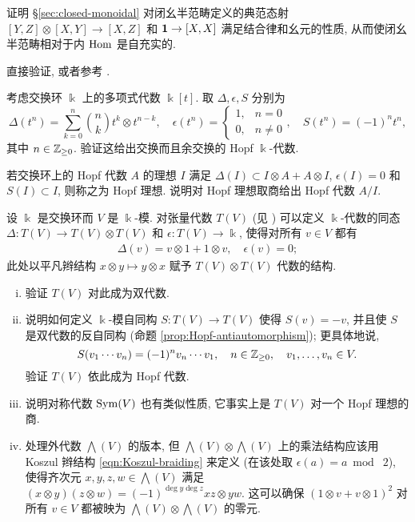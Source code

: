 \begin{Exercises}
	\item 证明 \S\ref{sec:closed-monoidal} 对闭幺半范畴定义的典范态射 $[Y, Z] \otimes [X, Y] \to [X, Z]$ 和 $\bm{1} \to [X, X]$ 满足结合律和幺元的性质, 从而使闭幺半范畴相对于内 $\operatorname{Hom}$ 是自充实的.
	\begin{hint}
		直接验证, 或者参考 \cite[Section 1.6]{Kel05}.
	\end{hint}

	\item 考虑交换环 $\Bbbk$ 上的多项式代数 $\Bbbk[t]$. 取 $\Delta, \epsilon, S$ 分别为
	\[ \Delta(t^n) = \sum_{k=0}^n \binom{n}{k} t^k \otimes t^{n-k}, \quad \epsilon(t^n) = \begin{cases}
		1, & n = 0 \\
		0, & n \neq 0
	\end{cases}, \quad
	S(t^n) = (-1)^n t^n, \]
	其中 $n \in \mathbb{Z}_{\geq 0}$. 验证这给出交换而且余交换的 Hopf $\Bbbk$-代数.
	
	\item 若交换环上的 Hopf 代数 $A$ 的理想 $I$ 满足 $\Delta(I) \subset I \otimes A + A \otimes I$, $\epsilon(I) = 0$ 和 $S(I) \subset I$, 则称之为 Hopf 理想. 说明对 Hopf 理想取商给出 Hopf 代数 $A/I$.
	
	\item 设 $\Bbbk$ 是交换环而 $V$ 是 $\Bbbk$-模. 对张量代数 $T(V)$ (见 \cite[定义 7.5.1]{Li1}) 可以定义 $\Bbbk$-代数的同态 $\Delta: T(V) \to T(V) \otimes T(V)$ 和 $\epsilon: T(V) \to \Bbbk$, 使得对所有 $v \in V$ 都有
	\begin{gather*}
		\Delta(v) = v \otimes 1 + 1 \otimes v, \quad \epsilon(v) = 0;
	\end{gather*}
	此处以平凡辫结构 $x \otimes y \mapsto y \otimes x$ 赋予 $T(V) \otimes T(V)$ 代数的结构.
	\begin{enumerate}[(i)]
		\item 验证 $T(V)$ 对此成为双代数.
		\item 说明如何定义 $\Bbbk$-模自同构 $S: T(V) \to T(V)$ 使得 $S(v) = -v$, 并且使 $S$ 是双代数的反自同构 (命题 \ref{prop:Hopf-antiautomorphism}); 更具体地说,
		\[ S(v_1 \cdots v_n) = (-1)^n v_n \cdots v_1, \quad n \in \mathbb{Z}_{\geq 0}, \quad v_1, \ldots, v_n \in V. \]
		验证 $T(V)$ 依此成为 Hopf 代数.
		\item 说明对称代数 $\operatorname{Sym}(V)$ 也有类似性质, 它事实上是 $T(V)$ 对一个 Hopf 理想的商.
		\item 处理外代数 $\bigwedge(V)$ 的版本, 但 $\bigwedge(V) \otimes \bigwedge(V)$ 上的乘法结构应该用 Koszul 辫结构 \eqref{eqn:Koszul-braiding} 来定义 (在该处取 $\epsilon(a) = a \bmod\; 2$), 使得齐次元 $x, y, z, w \in \bigwedge(V)$ 满足 $(x \otimes y)(z \otimes w) = (-1)^{\deg y \deg z} xz \otimes yw$. 这可以确保 $(1 \otimes v + v \otimes 1)^2$ 对所有 $v \in V$ 都被映为 $\bigwedge(V) \otimes \bigwedge(V)$ 的零元.
	\end{enumerate}
	

\end{Exercises}
